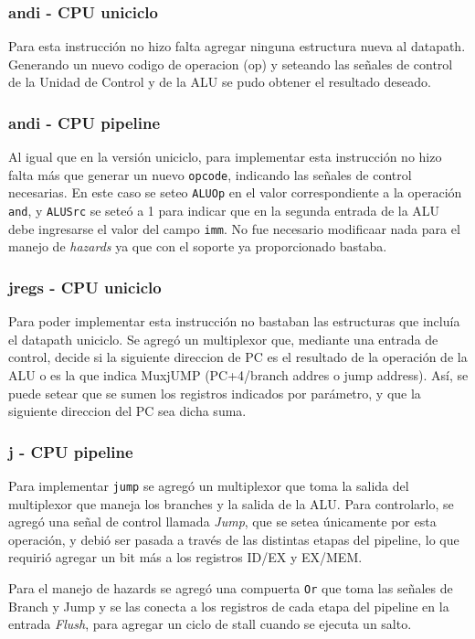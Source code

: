 \documentclass[a4paper, 12pt]{article}
\begin{document}
	\subsubsection{andi - CPU uniciclo}
	Para esta instrucción no hizo falta agregar ninguna estructura nueva al datapath. Generando un nuevo codigo de operacion (op) y seteando las señales de control de la Unidad de Control y de la ALU  se pudo obtener el resultado deseado.
	
	\subsubsection{andi - CPU pipeline}
	Al igual que en la versión uniciclo, para implementar esta instrucción no hizo falta más que generar un nuevo \texttt{opcode}, indicando las señales de control necesarias. En este caso se seteo \texttt{ALUOp} en el valor correspondiente a la operación \texttt{and}, y \texttt{ALUSrc} se seteó a 1 para indicar que en la segunda entrada de la ALU debe ingresarse el valor del campo \texttt{imm}. 
	No fue necesario modificaar nada para el manejo de \textit{hazards} ya que con el soporte ya proporcionado bastaba.
	 
	\subsubsection{jregs - CPU uniciclo}
	Para poder implementar esta instrucción no bastaban las estructuras que incluía el datapath uniciclo.
	Se agregó un multiplexor que, mediante una entrada de control, decide si la siguiente direccion de PC es el resultado de la operación de la ALU o es la que indica MuxjUMP (PC+4/branch addres o jump address). Así, se puede setear que se sumen los registros indicados por parámetro, y que la siguiente direccion del PC sea dicha suma.
	\subsubsection{j - CPU pipeline}
	Para implementar \texttt{jump} se agregó un multiplexor que toma la salida del multiplexor que maneja los branches y la salida de la ALU. Para controlarlo, se agregó una señal de control llamada \textit{Jump}, que se setea únicamente por esta operación, y debió ser pasada a través de las distintas etapas del pipeline, lo que requirió agregar un bit más a los registros ID/EX y EX/MEM.
	
	Para el manejo de hazards se agregó una compuerta \texttt{Or} que toma las señales de Branch y Jump y se las conecta a los registros de cada etapa del pipeline en la entrada \textit{Flush}, para agregar un ciclo de stall cuando se ejecuta un salto.
\end{document}
